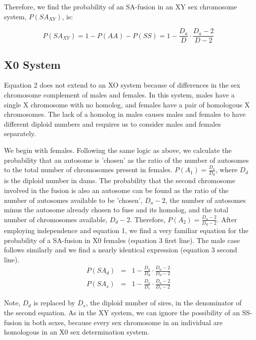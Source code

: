 \documentclass[12pt]{article}
\begin{document}
Therefore, we find the probability of an SA-fusion in an XY sex chromosome system, $P(SA_{XY})$, is:

\begin{equation}
    P(SA_{XY}) = 1 - P(AA) - P(SS) = 1 - \frac{D_a}{D} \cdot \frac{D_a - 2}{D - 2}
\end{equation}

\subsection{X0 System}
Equation 2 does not extend to an XO system because of differences in the sex chromosome complement of males and females. 
In this system, males have a single X chromosome with no homolog, and females have a pair of homologous X chromosomes. 
The lack of a homolog in males causes males and females to have different diploid numbers and requires us to consider males and females separately. 

We begin with females. Following the same logic as above, we calculate the probability that an autosome is 'chosen' as the ratio of the number of autosomes to the total number of chromosomes present in females. 
$P(A_1) = \frac{D_a}{D_d}$, where $D_d$ is the diploid number in dams. 
The probability that the second chromosome involved in the fusion is also an autosome can be found as the ratio of the number of autosomes available to be 'chosen', $D_a - 2$, the number of autosomes minus the autosome already chosen to fuse and its homolog, and the total number of chromosomes available, $D_d - 2$. 
Therefore, $P(A_2) = \frac{D_a - 2}{D_d - 2}$. 
After employing independence and equation 1, we find a very familiar equation for the probability of a SA-fusion in X0 females (equation 3 first line). 
The male case follows similarly and we find a nearly identical expression (equation 3 second line).
\begin{equation}
    \begin{array}{rcl} P(SA_d) & = & 1 - \frac{D_a}{D_d} \cdot \frac{D_a - 2}{D_d - 2} \\ P(SA_s) & = & 1 - \frac{D_a}{D_s} \cdot \frac{D_a - 2}{D_s - 2}\end{array}
\end{equation}


Note, $D_d$ is replaced by $D_s$, the diploid number of sires, in the denominator of the second equation.
As in the XY system, we can ignore the possibility of an SS-fusion in both sexes, because every sex chromosome in an individual are homologous in an X0 sex determination system.
\end{document}
